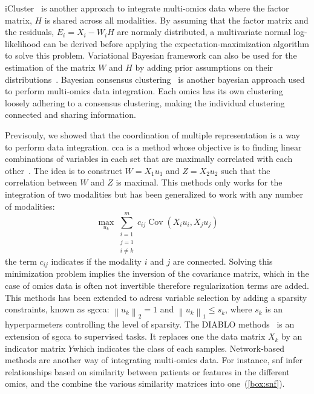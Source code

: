 \documentclass[../main.tex]{subfiles}
\begin{document}
	iCluster~\cite{Shen2009} is another approach to integrate multi-omics data where the factor matrix, \(H\) is shared across all modalities.
	By assuming that the factor matrix and the residuals, \(E_i = X_i - W_i H\) are normaly distributed, a multivariate normal log-likelihood can be derived before applying the expectation-maximization algorithm to solve this problem.
	Variational Bayesian framework can also be used for the estimation of the matrix \(W\) and \(H\) by adding prior assumptions on their distributions~\cite{MOFA}.
	Bayesian consensus clustering~\cite{Lock2013_BCC} is another bayesian approach used to perform multi-omics data integration.
	Each omics has its own clustering loosely adhering to a consensus clustering, making the individual clustering connected and sharing information.

	Previsouly, we showed that the coordination of multiple representation is a way to perform data integration.
	\Gls{cca} is a method whose objective is to finding linear combinations of variables in each set that are maximally correlated with each other~\cite{Hardle2007}.
	The idea is to construct \(W=X_1u_1\) and \(Z=X_2u_2\) such that the correlation between \(W\) and \(Z\) is maximal.
	This methods only works for the integration of two modalities but has been generalized to work with any number of modalities:
	\begin{equation}
	    \max_{u_k} \sum_{\substack{i=1 \\ j=1 \\ i\neq k}}^{m} c_{ij}\operatorname{Cov}\left(X_i u_i,X_j u_j\right)
	\end{equation}
	the term \(c_{ij}\) indicates if the modality \(i\) and \(j\) are connected.
	Solving this minimization problem implies the inversion of the covariance matrix, which in the case of omics data is often not invertible therefore regularization terms are added.
	This methods has been extended to adress variable selection by adding a sparsity constraints, known as \gls{sgcca}: \({\left\|u_k \right\|}_2 = 1\) and \({\left\|u_k \right\|}_1 \leq s_k\), where \(s_k\) is an hyperparmeters controlling the level of sparsity.
	The DIABLO methods~\cite{DIABLO} is an extension of \gls{sgcca} to supervised tasks.
	It replaces one the data matrix \(X_k\) by an indicator matrix \(Y\)which indicates the class of each samples.
	Network-based methods are another way of integrating multi-omics data.
	For instance, \gls{snf} infer relationships based on similarity between patients or features in the different omics, and the combine the various similarity matrices into one~(\cref{box:snf}).
\end{document}
